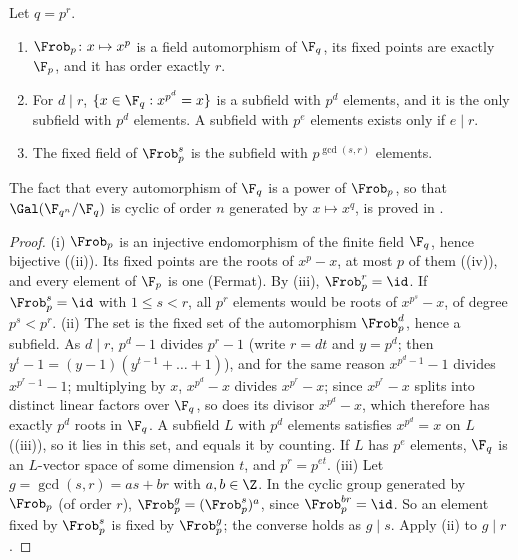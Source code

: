 \begin{proposition}\label{prop:rings:frobenius}
Let $q=p^r$.
\begin{enumerate}[label=(\roman*)]
\item $\Frob_p\colon x\mapsto x^p$ is a field automorphism of $\F_q$, its fixed points are exactly $\F_p$, and it has order exactly $r$.
\item For $d\mid r$, $\{x\in\F_q:x^{p^d}=x\}$ is a subfield with $p^d$ elements, and it is the only subfield with $p^d$ elements. A subfield with
$p^e$ elements exists only if $e\mid r$.
\item The fixed field of $\Frob_p^s$ is the subfield with $p^{\gcd(s,r)}$ elements.
\end{enumerate}
The fact that every automorphism of $\F_q$ is a power of $\Frob_p$, so that $\Gal(\F_{q^n}/\F_q)$ is cyclic of order $n$ generated by $x\mapsto x^q$,
is proved in .
\end{proposition}

\begin{proof}
(i) $\Frob_p$ is an injective endomorphism of the finite field $\F_q$, hence bijective ((ii)). Its fixed points are
the roots of $x^p-x$, at most $p$ of them ((iv)), and every element of $\F_p$ is one (Fermat). By
(iii), $\Frob_p^r=\id$. If $\Frob_p^s=\id$ with $1\le s<r$, all $p^r$ elements would be roots of $x^{p^s}-x$, of degree
$p^s<p^r$.
(ii) The set is the fixed set of the automorphism $\Frob_p^d$, hence a subfield. As $d\mid r$, $p^d-1$ divides $p^r-1$ (write $r=dt$ and
$y=p^d$; then $y^t-1=(y-1)(y^{t-1}+\dots+1)$), and for the same reason $x^{p^d-1}-1$ divides $x^{p^r-1}-1$; multiplying by $x$, $x^{p^d}-x$ divides $x^{p^r}-x$; since $x^{p^r}-x$ splits into distinct linear factors over $\F_q$, so does its divisor $x^{p^d}-x$, which therefore has exactly $p^d$
roots in $\F_q$. A subfield $L$ with $p^d$ elements satisfies $x^{p^d}=x$ on $L$ ((iii)), so it lies in this set,
and equals it by counting. If $L$ has $p^e$ elements, $\F_q$ is an $L$-vector space of some dimension $t$, and $p^r=p^{et}$.
(iii) Let $g=\gcd(s,r)=as+br$ with $a,b\in\Z$. In the cyclic group generated by $\Frob_p$ (of order $r$), $\Frob_p^g=(\Frob_p^s)^a$, since
$\Frob_p^{br}=\id$. So an element fixed by $\Frob_p^s$ is fixed by $\Frob_p^g$; the converse holds as $g\mid s$. Apply (ii) to $g\mid r$.
\end{proof}

